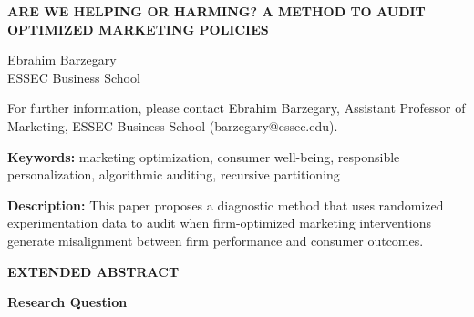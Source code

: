 \documentclass[12pt]{article}
\begin{document}
\begin{center}
\textbf{\MakeUppercase{Are We Helping or Harming? A Method to Audit Optimized Marketing Policies}}
\end{center}

\vspace{0.5em}

\begin{center}
Ebrahim Barzegary \\
ESSEC Business School
\end{center}

\vspace{0.5em}

For further information, please contact Ebrahim Barzegary, Assistant Professor of Marketing, ESSEC Business School (barzegary@essec.edu).

\vspace{0.75em}

\textbf{Keywords:} marketing optimization, consumer well-being, responsible personalization, algorithmic auditing, recursive partitioning

\vspace{0.75em}

\textbf{Description:} This paper proposes a diagnostic method that uses randomized experimentation data to audit when firm-optimized marketing interventions generate misalignment between firm performance and consumer outcomes.

\vspace{1.5em}

\begin{center}
\textbf{\MakeUppercase{Extended Abstract}}
\end{center}

\vspace{1em}

\textbf{Research Question}
\end{document}
